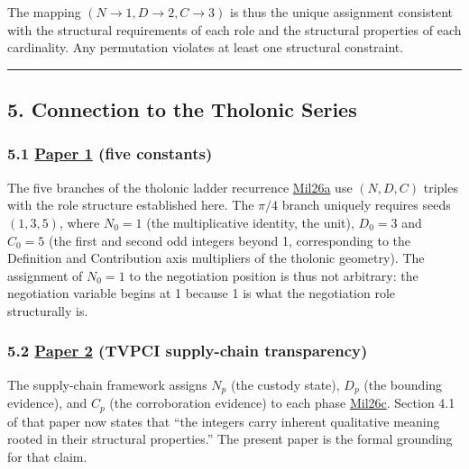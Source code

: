 \documentclass[
  11pt,
  letterpaper,
]{article}
\begin{document}
The mapping \((N \to 1, D \to 2, C \to 3)\) is thus the unique
assignment consistent with the structural requirements of each role and
the structural properties of each cardinality. Any permutation violates
at least one structural constraint.

\begin{center}\rule{0.5\linewidth}{0.5pt}\end{center}

\subsection{5. Connection to the Tholonic
Series}\label{connection-to-the-tholonic-series}

\subsubsection{\texorpdfstring{5.1
\href{https://github.com/baardev/truevalue/blob/main/docnav/Research/papers/1_recursive-tholonic-five-constants/1_recursive-tholonic-five-constants.pdf}{Paper
1} (five
constants)}{5.1 Paper 1 (five constants)}}\label{paper-1-five-constants}

The five branches of the tholonic ladder recurrence
\href{https://github.com/baardev/truevalue/blob/main/docnav/Research/papers/1_recursive-tholonic-five-constants/1_recursive-tholonic-five-constants.pdf}{Mil26a}
use \((N, D, C)\) triples with the role structure established here. The
\(\pi/4\) branch uniquely requires seeds \((1, 3, 5)\), where
\(N_0 = 1\) (the multiplicative identity, the unit), \(D_0 = 3\) and
\(C_0 = 5\) (the first and second odd integers beyond 1, corresponding
to the Definition and Contribution axis multipliers of the tholonic
geometry). The assignment of \(N_0 = 1\) to the negotiation position is
thus not arbitrary: the negotiation variable begins at 1 because 1 is
what the negotiation role structurally is.

\subsubsection{\texorpdfstring{5.2
\href{https://github.com/baardev/truevalue/blob/main/docnav/Research/papers/2_supply-chain-transparency-tvpci/2_supply-chain-transparency-tvpci.pdf}{Paper
2} (TVPCI supply-chain
transparency)}{5.2 Paper 2 (TVPCI supply-chain transparency)}}\label{paper-2-tvpci-supply-chain-transparency}

The supply-chain framework assigns \(N_p\) (the custody state), \(D_p\)
(the bounding evidence), and \(C_p\) (the corroboration evidence) to
each phase
\href{https://github.com/baardev/truevalue/blob/main/docnav/Research/papers/2_supply-chain-transparency-tvpci/2_supply-chain-transparency-tvpci.pdf}{Mil26c}.
Section 4.1 of that paper now states that ``the integers carry inherent
qualitative meaning rooted in their structural properties.'' The present
paper is the formal grounding for that claim.
\end{document}
